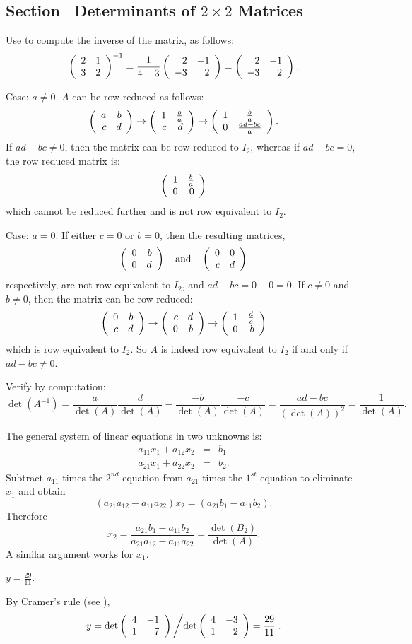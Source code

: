 \documentclass{ximera}
\begin{document}
\subsection*{Section~\protect{\ref{S:det2x2}} Determinants of $2\times 2$ Matrices}

Use  to compute the inverse of the matrix,
as follows:
\[ \left(\begin{array}{rr} 2 & 1\\ 3 &2\end{array}\right)^{-1} = \frac{1}{4-3}\left(\begin{array}{rr} 2 & -1\\ -3 &2\end{array}\right)
= \left(\begin{array}{rr} 2 & -1\\ -3 &2\end{array}\right). \]

Case: $a \neq 0$.  $A$ can be row reduced as follows:
\[ \left(\begin{array}{rr} a & b\\ c &d\end{array}\right) \rightarrow
\left(\begin{array}{rr} 1 & \frac{b}{a}\\ c &d\end{array}\right) \rightarrow
\left(\begin{array}{cc} 1 & \frac{b}{a}\\ 0 &\frac{ad - bc}{a}\end{array}\right). \]
If $ad - bc \neq 0$, then the matrix can be row reduced to $I_2$, whereas
if $ad - bc = 0$, the row reduced matrix is:
\[ \left(\begin{array}{rr} 1 & \frac{b}{a}\\ 0 &0\end{array}\right) \]
which cannot be reduced further and is not row equivalent to $I_2$.

Case: $a = 0$.  If either $c = 0$ or $b = 0$, then the resulting matrices,
\[ \left(\begin{array}{rr} 0 & b\\ 0 &d\end{array}\right) \quad\mbox{and}\quad \left(\begin{array}{rr} 0 & 0\\ c &d\end{array}\right) \]
respectively, are not row equivalent to $I_2$, and $ad - bc = 0 - 0 = 0$.
If $c \neq 0$ and $b \neq 0$, then the matrix can be row reduced:
\[ \left(\begin{array}{rr} 0 & b\\ c &d\end{array}\right) \rightarrow
\left(\begin{array}{rr} c & d\\ 0 &b\end{array}\right) \rightarrow \left(\begin{array}{rr} 1 & \frac{d}{c}\\ 0 &b\end{array}\right) \]
which is row equivalent to $I_2$.  So $A$ is indeed row equivalent
to $I_2$ if and only if $ad - bc \neq 0$.

Verify by computation:
\[ \det(A^{-1}) = \frac{a}{\det(A)}\frac{d}{\det(A)} -
\frac{-b}{\det(A)}\frac{-c}{\det(A)} = \frac{ad - bc}{(\det(A))^2} =
\frac{1}{\det(A)}. \]

The general system of linear equations in two unknowns is:
\begin{eqnarray*}
a_{11}x_1+a_{12}x_2 & = & b_1\\
a_{21}x_1+a_{22}x_2 & = & b_2.
\end{eqnarray*}
Subtract $a_{11}$ times the $2^{nd}$ equation from $a_{21}$ times the $1^{st}$ 
equation to eliminate $x_1$ and obtain
\[
(a_{21}a_{12}-a_{11}a_{22})x_2 = (a_{21}b_1-a_{11}b_2).
\]
Therefore
\[
x_2 =  \frac{a_{21}b_1-a_{11}b_2}{a_{21}a_{12}-a_{11}a_{22}}
= \frac{\det(B_2)}{\det(A)}.
\]
A similar argument works for $x_1$.

 \ans  $y=\frac{29}{11}$.

\soln By Cramer's rule (see ),
\[
y = \det\left(\begin{array}{rr} 4 & -1\\ 1 &7\end{array}\right)\left/\det\left(\begin{array}{rr} 4 & -3\\ 1 &2\end{array}\right)=\frac{29}{11}\right..
\]
\end{document}
